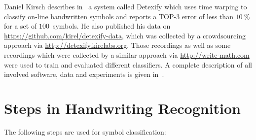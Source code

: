 \documentclass[9pt,technote]{IEEEtran}
\begin{document}
Daniel Kirsch describes in~\cite{Kirsch} a system called Detexify which uses
time warping to classify on-line handwritten symbols and reports a
TOP-3 error of less than $\SI{10}{\percent}$ for a set of $\num{100}$~symbols.
He also published his data on \url{https://github.com/kirel/detexify-data},
which was collected by a crowdsourcing approach via
\url{http://detexify.kirelabs.org}. Those recordings as well as some recordings
which were collected by a similar approach via \url{http://write-math.com} were
used to train and evaluated different classifiers. A complete description of
all involved software, data and experiments is given in~\cite{Thoma:2014}.


\section{Steps in Handwriting Recognition}

The following steps are used for symbol classification:
\end{document}

